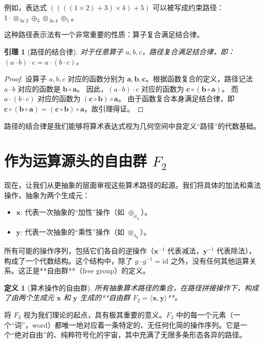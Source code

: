 \documentclass[a4paper,12pt]{book}
\numberwithin{problem}{section}
\newtheorem{definition}{定义}
\numberwithin{definition}{section}
\newtheorem{lemma}{引理}
\numberwithin{lemma}{section}
\numberwithin{proposition}{section}
\numberwithin{theorem}{section}
\numberwithin{grammar}{section}
\numberwithin{program}{section}
\numberwithin{convention}{section}
\numberwithin{corollary}{section}
\begin{document}
例如，表达式 $((((1 \times 2) + 3) \times 4) + 5)$ 可以被写成约束路径：
$1 \cdot \otimes_{\ln 2} \oplus_3 \otimes_{\ln 4} \oplus_5$。

这种路径表示法有一个非常重要的性质：算子复合满足结合律。

\begin{lemma}[路径的结合律]
    \label{lemma:path_associativity}
    对于任意算子 $a, b, c$，路径复合满足结合律，即：$(a \cdot b) \cdot c = a \cdot (b \cdot c)$。
\end{lemma}
\begin{proof}
    设算子 $a, b, c$ 对应的函数分别为 $\mathbf{a}, \mathbf{b}, \mathbf{c}$。根据函数复合的定义，路径记法 $a \cdot b$ 对应的函数是 $\mathbf{b} \circ \mathbf{a}$。
    因此，$(a \cdot b) \cdot c$ 对应的函数为 $\mathbf{c} \circ (\mathbf{b} \circ \mathbf{a})$。
    而 $a \cdot (b \cdot c)$ 对应的函数为 $(\mathbf{c} \circ \mathbf{b}) \circ \mathbf{a}$。
    由于函数复合本身满足结合律，即 $\mathbf{c} \circ (\mathbf{b} \circ \mathbf{a}) = (\mathbf{c} \circ \mathbf{b}) \circ \mathbf{a}$，故引理得证。
\end{proof}
路径的结合律是我们能够将算术表达式视为几何空间中良定义“路径”的代数基础。

\section{作为运算源头的自由群 $F_2$}
\label{sec:free_group_f2}

现在，让我们从更抽象的层面审视这些算术路径的起源。我们将具体的加法和乘法操作，抽象为两个生成元：
\begin{itemize}
    \item $\mathbf{x}$: 代表一次抽象的“加性”操作（如 $\oplus_{\mu_0}$）。
    \item $\mathbf{y}$: 代表一次抽象的“乘性”操作（如 $\otimes_{\lambda_0}$）。
\end{itemize}
所有可能的操作序列，包括它们各自的逆操作（$\mathbf{x}^{-1}$ 代表减法，$\mathbf{y}^{-1}$ 代表除法），构成了一个代数结构。这个结构中，除了 $g \cdot g^{-1} = \text{id}$ 之外，没有任何其他运算关系。这正是**自由群**（free group）的定义。

\begin{definition}[算术操作的自由群]
    \label{def:free_group_F2}
    所有抽象算术路径的集合，在路径拼接操作下，构成了由两个生成元 $\mathbf{x}$ 和 $\mathbf{y}$ 生成的**自由群 $F_2 = \langle \mathbf{x}, \mathbf{y} \rangle$**。
\end{definition}

将 $F_2$ 视为我们理论的起点，具有极其重要的意义。$F_2$ 中的每一个元素（一个“词”，word）都唯一地对应着一条特定的、无任何化简的操作序列。它是一个“绝对自由”的、纯粹符号化的宇宙，其中充满了无限多条形态各异的路径。
\end{document}
